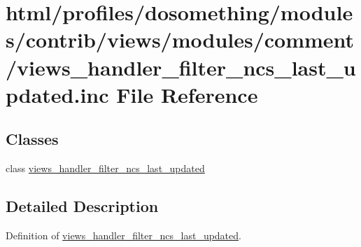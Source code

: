 \hypertarget{views__handler__filter__ncs__last__updated_8inc}{
\section{html/profiles/dosomething/modules/contrib/views/modules/comment/views\_\-handler\_\-filter\_\-ncs\_\-last\_\-updated.inc File Reference}
\label{views__handler__filter__ncs__last__updated_8inc}
}
\subsection*{Classes}
\begin{DoxyCompactItemize}
\item 
class \hyperlink{classviews__handler__filter__ncs__last__updated}{views\_\-handler\_\-filter\_\-ncs\_\-last\_\-updated}
\end{DoxyCompactItemize}


\subsection{Detailed Description}
Definition of \hyperlink{classviews__handler__filter__ncs__last__updated}{views\_\-handler\_\-filter\_\-ncs\_\-last\_\-updated}. 